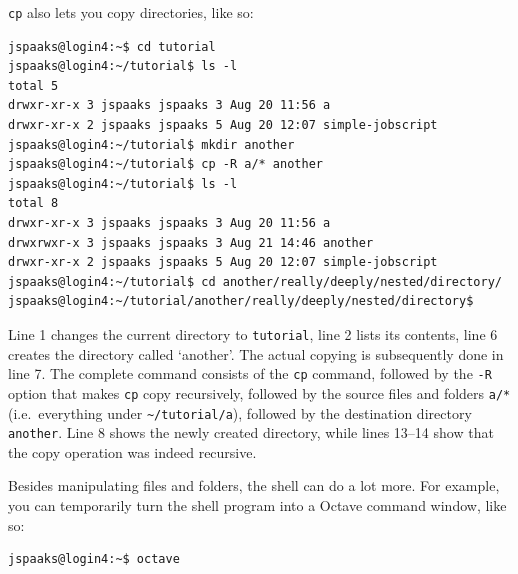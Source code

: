 \lstinline{cp} also lets you copy directories, like so:
\begin{lstlisting}[style=basic,style=bash,style=numbered]
jspaaks@login4:~$ cd tutorial
jspaaks@login4:~/tutorial$ ls -l
total 5
drwxr-xr-x 3 jspaaks jspaaks 3 Aug 20 11:56 a
drwxr-xr-x 2 jspaaks jspaaks 5 Aug 20 12:07 simple-jobscript
jspaaks@login4:~/tutorial$ mkdir another
jspaaks@login4:~/tutorial$ cp -R a/* another
jspaaks@login4:~/tutorial$ ls -l
total 8
drwxr-xr-x 3 jspaaks jspaaks 3 Aug 20 11:56 a
drwxrwxr-x 3 jspaaks jspaaks 3 Aug 21 14:46 another
drwxr-xr-x 2 jspaaks jspaaks 5 Aug 20 12:07 simple-jobscript
jspaaks@login4:~/tutorial$ cd another/really/deeply/nested/directory/
jspaaks@login4:~/tutorial/another/really/deeply/nested/directory$
\end{lstlisting}
Line 1 changes the current directory to \lstinline[style=bashinline]{tutorial}, line 2 lists its contents, line 6 creates the directory called `another'. The actual copying is subsequently done in line 7. The complete command consists of the \lstinline[style=bashinline]{cp} command, followed by the \lstinline[style=bashinline]{-R} option that makes \lstinline[style=bashinline]{cp} copy recursively, followed by the source files and folders \lstinline[style=bashinline]{a/*} (i.e.~everything under \lstinline[style=bashinline]{~/tutorial/a}), followed by the destination directory \lstinline[style=bashinline]{another}. Line 8 shows the newly created directory, while lines 13--14 show that the copy operation was indeed recursive.

Besides manipulating files and folders, the shell can do a lot more. For example, you can temporarily turn the shell program into a Octave command window, like so:
\begin{lstlisting}[style=basic,style=bash]
jspaaks@login4:~$ octave
\end{lstlisting}

